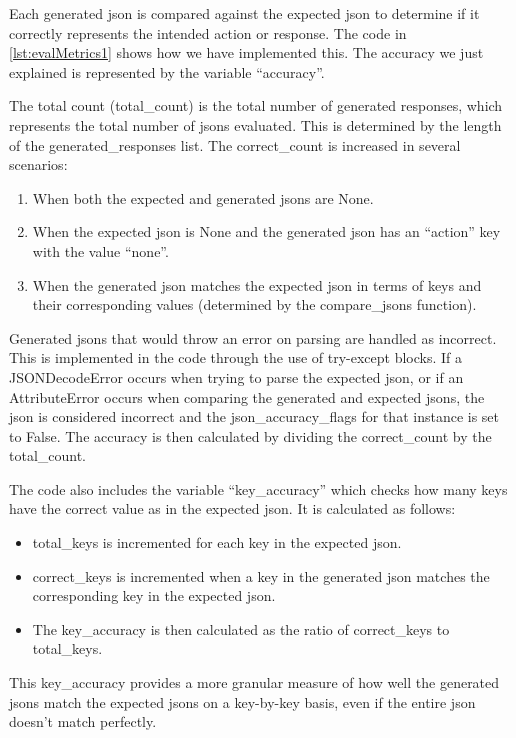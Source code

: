 Each generated \gls{json} is compared against the expected \gls{json} to determine if it correctly represents the intended action or response. 
The code in \cref{lst:evalMetrics1} shows how we have implemented this. The accuracy we just explained is represented by the variable ``accuracy''.

The total count (total\_count) is the total number of generated responses, which represents the total number of \glspl{json} evaluated. This is determined by the length of the generated\_responses list.
The correct\_count is increased in several scenarios:
\begin{enumerate}
    \item When both the expected and generated \glspl{json} are None.
    \item When the expected \gls{json} is None and the generated \gls{json} has an ``action'' key with the value ``none''.
    \item When the generated \gls{json} matches the expected \gls{json} in terms of keys and their corresponding values (determined by the compare\_jsons function).
\end{enumerate}
Generated \glspl{json} that would throw an error on parsing are handled as incorrect. This is implemented in the code through the use of try-except blocks. If a JSONDecodeError occurs when trying to parse the expected \gls{json}, or if an AttributeError occurs when comparing the generated and expected \glspl{json}, the \gls{json} is considered incorrect and the json\_accuracy\_flags for that instance is set to False.
The accuracy is then calculated by dividing the correct\_count by the total\_count.

The code also includes the variable ``key\_accuracy'' which checks how many keys have the correct value as in the expected \gls{json}. It is calculated as follows:
\begin{itemize}
    \item total\_keys is incremented for each key in the expected \gls{json}.
    \item correct\_keys is incremented when a key in the generated \gls{json} matches the corresponding key in the expected \gls{json}.
    \item The key\_accuracy is then calculated as the ratio of correct\_keys to total\_keys.
\end{itemize}
This key\_accuracy provides a more granular measure of how well the generated \glspl{json} match the expected \glspl{json} on a key-by-key basis, even if the entire \gls{json} doesn't match perfectly.

